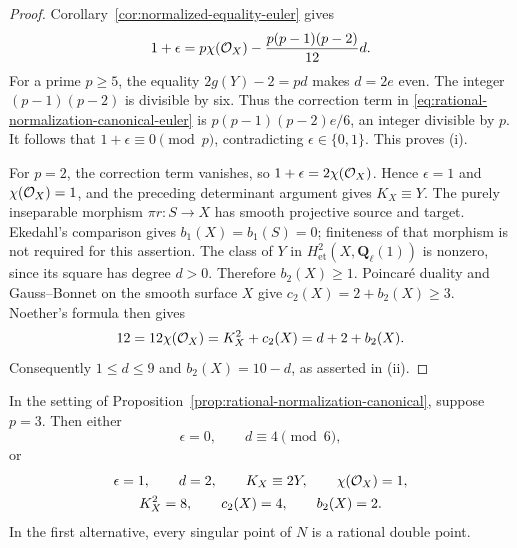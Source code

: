 \begin{proof}
Corollary~\ref{cor:normalized-equality-euler} gives
\begin{equation}\label{eq:rational-normalization-canonical-euler}
 1+\epsilon
 =p\chi(\mathcal O_X)-\frac{p(p-1)(p-2)}{12}d.
\end{equation}
For a prime $p\geq5$, the equality $2g(Y)-2=pd$ makes $d=2e$
even. The integer $(p-1)(p-2)$ is divisible by six.
Thus the correction term in
\eqref{eq:rational-normalization-canonical-euler} is
$p(p-1)(p-2)e/6$, an integer divisible by $p$.
It follows that $1+\epsilon\equiv0\pmod p$, contradicting
$\epsilon\in\{0,1\}$.
This proves \textup{(i)}.

For $p=2$, the correction term vanishes, so
$1+\epsilon=2\chi(\mathcal O_X)$.
Hence $\epsilon=1$ and $\chi(\mathcal O_X)=1$, and the preceding
determinant argument gives $K_X\equiv Y$.
The purely inseparable morphism $\pi r:S\to X$ has smooth
projective source and target. Ekedahl's comparison
\cite[Lemma~0.1.5, p.~103]{EkedahlCanonical} gives
$b_1(X)=b_1(S)=0$; finiteness of that morphism is not required
for this assertion.
The class of $Y$ in $H^2_{\mathrm{et}}(X,\mathbf Q_\ell(1))$
is nonzero, since its square has degree $d>0$.
Therefore $b_2(X)\geq1$.
Poincaré duality and Gauss--Bonnet on the smooth surface $X$
\cite[Section~45.7, especially Lemma~45.7.8, Tag~0FH0]{Stacks}
give $c_2(X)=2+b_2(X)\geq3$.
Noether's formula
\cite[Section~42.66, Tag~02UO]{Stacks} then gives
\[
 12=12\chi(\mathcal O_X)=K_X^2+c_2(X)=d+2+b_2(X).
\]
Consequently $1\leq d\leq9$ and $b_2(X)=10-d$, as asserted
in \textup{(ii)}.
\end{proof}

\begin{corollary}\label{cor:characteristic-three-rational-residual}
In the setting of Proposition~\ref{prop:rational-normalization-canonical},
suppose $p=3$.
Then either
\[
 \epsilon=0,\qquad d\equiv4\pmod6,
\]
or
\[
 \begin{gathered}
 \epsilon=1,\qquad d=2,\qquad
 K_X\equiv2Y,\qquad \chi(\mathcal O_X)=1,\\
 K_X^2=8,\qquad c_2(X)=4,\qquad b_2(X)=2.
 \end{gathered}
\]
In the first alternative, every singular point of $N$ is a rational
double point.
\end{corollary}

